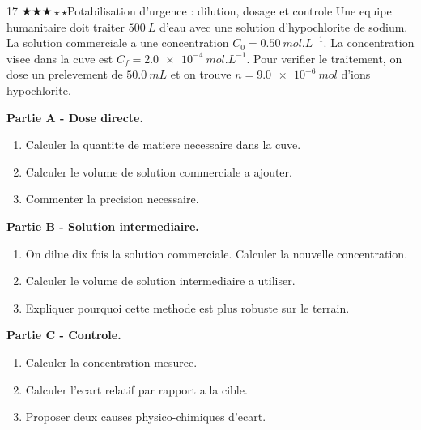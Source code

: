 \documentclass[11pt,a4paper]{article}
\newcommand{\diffthree}{\(\bigstar\bigstar\bigstar\star\star\)}
\begin{document}
\begin{probleme}{17 \diffthree}{Potabilisation d'urgence : dilution, dosage et controle}
Une equipe humanitaire doit traiter \(\SI{500}{L}\) d'eau avec une solution d'hypochlorite de sodium. La solution commerciale a une concentration \(C_0=\SI{0.50}{mol.L^{-1}}\). La concentration visee dans la cuve est \(C_f=\SI{2.0e-4}{mol.L^{-1}}\). Pour verifier le traitement, on dose un prelevement de \(\SI{50.0}{mL}\) et on trouve \(n=\SI{9.0e-6}{mol}\) d'ions hypochlorite.

\textbf{Partie A - Dose directe.}
\begin{enumerate}
\item Calculer la quantite de matiere necessaire dans la cuve.
\item Calculer le volume de solution commerciale a ajouter.
\item Commenter la precision necessaire.
\end{enumerate}

\textbf{Partie B - Solution intermediaire.}
\begin{enumerate}[resume]
\item On dilue dix fois la solution commerciale. Calculer la nouvelle concentration.
\item Calculer le volume de solution intermediaire a utiliser.
\item Expliquer pourquoi cette methode est plus robuste sur le terrain.
\end{enumerate}

\textbf{Partie C - Controle.}
\begin{enumerate}[resume]
\item Calculer la concentration mesuree.
\item Calculer l'ecart relatif par rapport a la cible.
\item Proposer deux causes physico-chimiques d'ecart.
\end{enumerate}
\end{probleme}
\end{document}
